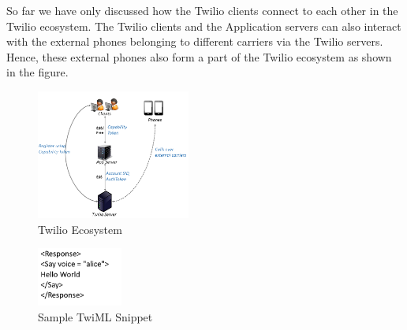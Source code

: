 So far we have only discussed how the Twilio clients connect to each other in the Twilio ecosystem. The Twilio clients and the Application servers can also interact with the external phones belonging to different carriers via the Twilio servers. Hence, these external phones also form a part of the Twilio ecosystem as shown in the figure.

\begin{figure}
\centering
  \centering
  \includegraphics[width=0.45\textwidth]{figs/Ecosystem.png}
\caption{Twilio Ecosystem}
\label{fig:ecosystem}
\end{figure}     
 \begin{figure}
 \centering
   \includegraphics[width=0.25\textwidth]{figs/TwiML.png}
 \caption{Sample TwiML Snippet}
 \label{fig:TwilML}
 \end{figure} 



